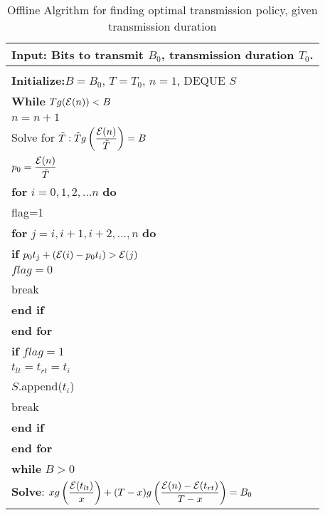 \begin{table}
\begin{minipage}[b]{8cm}
\caption{Offline Algrithm for finding optimal transmission policy, given transmission duration}
\begin{tabular}{p{7cm}}
\hline \textbf{Input}: Bits to transmit $B_0$, transmission duration $T_0$.\\
\hline
\\
\textbf{Initialize:}$B = B_0$, $T = T_0$, $n=1$, DEQUE $S$
\\
\textbf{While} $Tg(\mathcal{E}(n)) < B$
\\
\hspace{4mm} $n = n+1$
\\
Solve for $\tilde{T}: \tilde{T}g\left(\dfrac{\mathcal{E}(n)}{\tilde{T}}\right) = B$
\\
$p_0=\dfrac{\mathcal{E}(n)}{\tilde{T}}$
\\
\textbf{for} $i=0,1,2,...n$ \textbf{do}
\\
\hspace{4mm}flag=1
\\
\hspace{4mm}\textbf{for} $j=i,i+1,i+2,...,n$ \textbf{do}
\\
\hspace{7mm}\textbf{if} $p_0t_j + (\mathcal{E}(i) - p_0t_i) > \mathcal{E}(j)$
\\
\hspace{10mm}$flag=0$
\\
\hspace{10mm}break
\\
\hspace{7mm}\textbf{end if}
\\
\hspace{4mm}\textbf{end for}
\\
\hspace{4mm}\textbf{if} $flag=1$
\\
\hspace{7mm}$t_{lt} = t_{rt} = t_i$
\\
\hspace{7mm} $S$.append($t_i$)
\\
\hspace{7mm}break
\\
\hspace{4mm}\textbf{end if}
\\
\textbf{end for}
\\
\textbf{while} $B>0$
\\
\hspace{4mm}\textbf{Solve}: $xg\left(\dfrac{\mathcal{E}(t_{lt})}{x}\right)+(T-x)g\left(\dfrac{\mathcal{E}(n)-\mathcal{E}(t_{rt})}{T-x}\right) = B_0$

\end{tabular}
\end{minipage}
\end{table}
